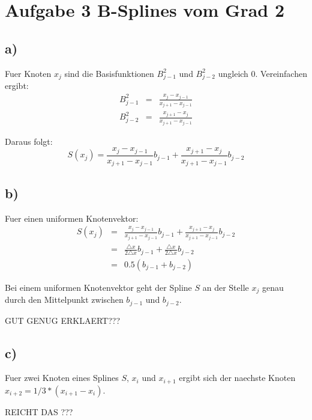 
\section*{Aufgabe 3 B-Splines vom Grad 2}

\subsection*{a)}
Fuer Knoten $x_j$ sind die Basisfunktionen $B^2_{j-1}$ und $B^2_{j-2}$ ungleich $0$. Vereinfachen ergibt:
\begin{eqnarray}
    B^2_{j-1}&=& \frac{x_j - x_{j-1}}{x_{j+1} - x_{j-1}} \\
    B^2_{j-2}&=& \frac{x_{j+1} - x_{j}}{x_{j+1} - x_{j-1}}
\end{eqnarray}

Daraus folgt: 
\begin{equation}
    S(x_j) = \frac{x_j - x_{j-1}}{x_{j+1} - x_{j-1}} b_{j-1} +  \frac{x_{j+1} - x_{j}}{x_{j+1} - x_{j-1}} b_{j-2}
\end{equation}



\subsection*{b)}

Fuer einen uniformen Knotenvektor:
\begin{eqnarray}
    S(x_j) &=& \frac{x_j - x_{j-1}}{x_{j+1} - x_{j-1}} b_{j-1} +  \frac{x_{j+1} - x_{j}}{x_{j+1} - x_{j-1}} b_{j-2} \\
     &=& \frac{\triangle x}{2 \triangle x} b_{j-1} +  \frac{\triangle x}{2 \triangle x} b_{j-2} \\
      &=& 0.5 ( b_{j-1} + b_{j-2}) 
\end{eqnarray}

Bei einem uniformen Knotenvektor geht der Spline $S$ an der Stelle $x_j$ genau durch den Mittelpunkt zwischen $b_{j-1}$ und  $b_{j-2}$.

GUT GENUG ERKLAERT???


\subsection*{c)}

Fuer zwei Knoten eines Splines $S$, $x_i$ und $x_{i+1}$ ergibt sich der  naechste Knoten $x_{i+2} = 1/3 *( x_{i+1}- x_i)$.

REICHT DAS ??? 

